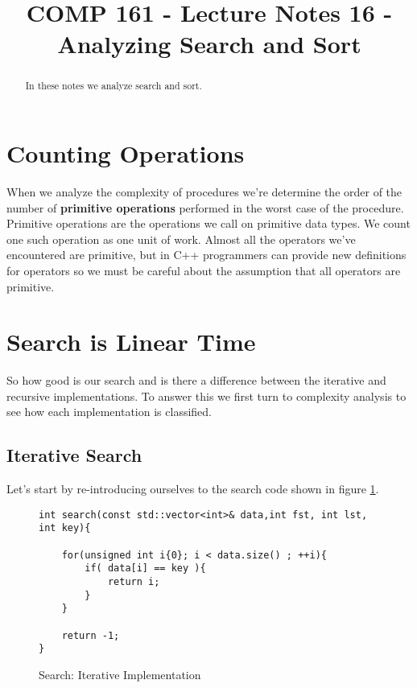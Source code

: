 \documentclass[]{tufte-handout}
\title{COMP 161 - Lecture Notes 16 - Analyzing Search and Sort}
\date{}
\begin{document}
 
\maketitle

\begin{abstract}
In these notes we analyze search and sort. 
\end{abstract}

\section{Counting Operations}

When we analyze the complexity of procedures we're determine the order of the number of \textbf{primitive operations} performed in the worst case of the procedure. Primitive operations are the operations we call on primitive data types. We count one such operation as one unit of work. Almost all the operators we've encountered are primitive, but in C++ programmers can provide new definitions for operators so we must be careful about the assumption that all operators are primitive. 

\section{Search is Linear Time}

So how good is our search and is there a difference between the iterative and recursive implementations. To answer this we first turn to complexity analysis to see how each implementation is classified. 

\subsection{Iterative Search}

Let's start by re-introducing ourselves to the search code shown in figure \ref{code:searchiter}.
\begin{figure}[htpb!]
\begin{lstlisting}
int search(const std::vector<int>& data,int fst, int lst, int key){

    for(unsigned int i{0}; i < data.size() ; ++i){
    	if( data[i] == key ){
			return i;
		}
    }

    return -1;
}
\end{lstlisting}
\label{code:searchiter}
\caption{Search: Iterative Implementation}
\end{figure}
\end{document}
